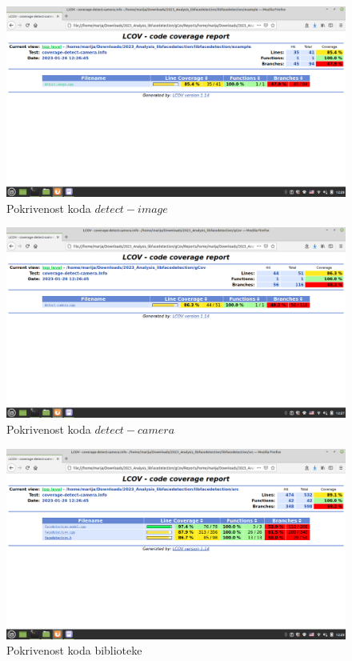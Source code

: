 \documentclass{article}
\begin{document}
\begin{figure}[H]
    \centering
    \includegraphics[width=12cm]{img/gcov/gcovDI.png}
    \caption{Pokrivenost koda $detect-image$}
    \label{di:gcov}
\end{figure}
\begin{figure}[H]
    \centering
    \includegraphics[width=12cm]{img/gcov/gcovDC.png}
    \caption{Pokrivenost koda $detect-camera$}
    \label{dc:gcov}
\end{figure}
\begin{figure}[H]
    \centering
    \includegraphics[width=12cm]{img/gcov/gcovSRC.png}
    \caption{Pokrivenost koda biblioteke }
    \label{src:gcov}
\end{figure}
\end{document}
